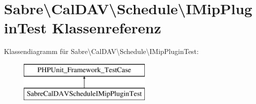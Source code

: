 \hypertarget{class_sabre_1_1_cal_d_a_v_1_1_schedule_1_1_i_mip_plugin_test}{}\section{Sabre\textbackslash{}Cal\+D\+AV\textbackslash{}Schedule\textbackslash{}I\+Mip\+Plugin\+Test Klassenreferenz}
\label{class_sabre_1_1_cal_d_a_v_1_1_schedule_1_1_i_mip_plugin_test}
Klassendiagramm für Sabre\textbackslash{}Cal\+D\+AV\textbackslash{}Schedule\textbackslash{}I\+Mip\+Plugin\+Test\+:\begin{figure}[H]
\begin{center}
\leavevmode
\includegraphics[height=2.000000cm]{class_sabre_1_1_cal_d_a_v_1_1_schedule_1_1_i_mip_plugin_test}
\end{center}
\end{figure}
